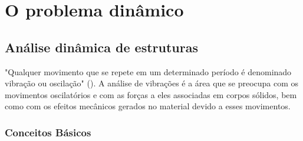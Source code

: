 \chapter{O problema dinâmico} 
\label{cap:3}

     
\section{Análise dinâmica de estruturas}

    \indent "Qualquer movimento que se repete em um determinado período é denominado vibração ou oscilação" (\citet{mechanicalvibrations2017}). A análise de vibrações é a área que se preocupa com os movimentos oscilatórios e com as forças a eles associadas em corpos sólidos, bem como com os efeitos mecânicos gerados no material devido a esses movimentos.  

\subsection{Conceitos Básicos} 

